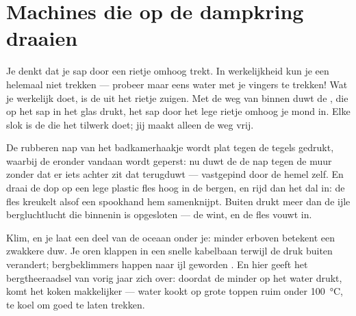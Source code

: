 \section{Machines die op de dampkring draaien}

\begin{example}\label{ex:g5:air-pressure-weather:straw}
Je denkt dat je sap door een rietje omhoog trekt. In werkelijkheid kun
je een  helemaal niet trekken --- probeer maar eens water met
je vingers te trekken! Wat je werkelijk doet, is de \emph{} uit
het rietje zuigen. Met de  weg van binnen duwt de ,
die op het sap in het glas drukt, het sap door het lege rietje omhoog
je mond in. Elke slok is de  die het tilwerk doet; jij maakt
alleen de weg vrij.
\end{example}

\begin{example}\label{ex:g5:air-pressure-weather:suction}
De rubberen nap van het badkamerhaakje wordt plat tegen de tegels
gedrukt, waarbij de  eronder vandaan wordt geperst: nu duwt de
 de nap tegen de muur zonder dat er iets achter zit dat
terugduwt --- vastgepind door de hemel zelf. En draai de dop op een
lege plastic fles hoog in de bergen, en rijd dan het dal in: de fles
kreukelt alsof een spookhand hem samenknijpt. Buiten drukt meer
 dan de ijle bergluchtlucht die binnenin is opgesloten --- de
 wint, en de fles vouwt in.
\end{example}

\begin{example}\label{ex:g5:air-pressure-weather:height}
Klim, en je laat een deel van de oceaan onder je: minder 
erboven betekent een zwakkere duw. Je oren klappen in een snelle
kabelbaan terwijl de druk buiten verandert; bergbeklimmers happen naar
ijl geworden . En hier geeft het bergtheeraadsel van vorig jaar
zich over: doordat de  minder op het water drukt, komt het
koken makkelijker --- water kookt op grote toppen ruim onder
\qty{100}{\celsius}, te koel om goed te laten trekken.
\end{example}

